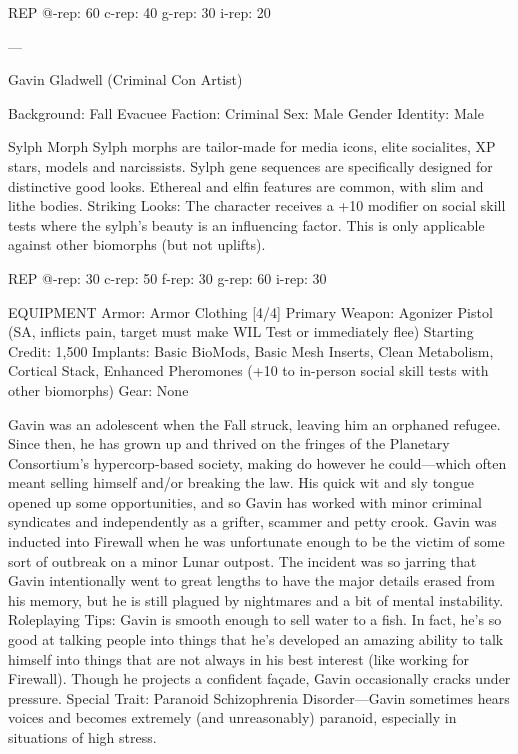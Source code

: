 ﻿%

   REP
   @-rep:	60
   c-rep:	40
   g-rep:	30
   i-rep:	20

---

Gavin Gladwell (Criminal Con Artist)

Background: Fall Evacuee
Faction: Criminal
Sex: Male
Gender Identity: Male

Sylph Morph
Sylph morphs are tailor-made for media icons, elite socialites, XP stars, models and narcissists. Sylph gene sequences are specifically designed for distinctive good looks. Ethereal and elfin features are common, with slim and lithe bodies.
Striking Looks: The character receives a +10 modifier on social skill tests where the sylph's beauty is an influencing factor. This is only applicable against other biomorphs (but not uplifts).

REP
@-rep:	30
c-rep:	50
f-rep:	30
g-rep:	60
i-rep:	30

EQUIPMENT
Armor: Armor Clothing [4/4]
Primary Weapon: Agonizer Pistol (SA, inflicts pain, target must make WIL Test or immediately flee)
Starting Credit: 1,500
Implants: Basic BioMods, Basic Mesh Inserts, Clean Metabolism, Cortical Stack, Enhanced Pheromones (+10 to in-person social skill tests with other biomorphs)
Gear: None


Gavin was an adolescent when the Fall struck, leaving him an orphaned refugee. Since then, he has grown up and thrived on the fringes of the Planetary Consortium’s hypercorp-based society, making do however he could—which often meant selling himself and/or breaking the law. His quick wit and sly tongue opened up some opportunities, and so Gavin has worked with minor criminal syndicates and independently as a grifter, scammer and petty crook. Gavin was inducted into Firewall when he was unfortunate enough to be the victim of some sort of outbreak on a minor Lunar outpost. The incident was so jarring that Gavin intentionally went to great lengths to have the major details erased from his memory, but he is still plagued by nightmares and a bit of mental instability.
Roleplaying Tips: Gavin is smooth enough to sell water to a fish. In fact, he’s so good at talking people into things that he’s developed an amazing ability to talk himself into things that are not always in his best interest (like working for Firewall). Though he projects a confident façade, Gavin occasionally cracks under pressure.
Special Trait: Paranoid Schizophrenia Disorder—Gavin sometimes hears voices and becomes extremely (and unreasonably) paranoid, especially in situations of high stress.

